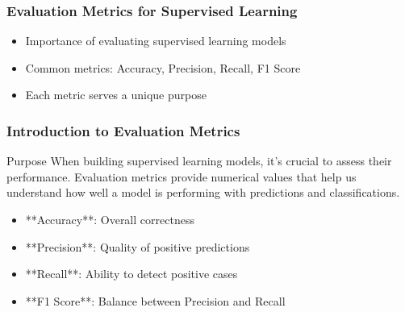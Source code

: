 \documentclass[aspectratio=169]{beamer}
\begin{document}
\begin{frame}[fragile]
    \frametitle{Evaluation Metrics for Supervised Learning}
    
    \begin{itemize}
        \item Importance of evaluating supervised learning models
        \item Common metrics: Accuracy, Precision, Recall, F1 Score
        \item Each metric serves a unique purpose
    \end{itemize}
\end{frame}

\begin{frame}[fragile]
    \frametitle{Introduction to Evaluation Metrics}
    
    \begin{block}{Purpose}
        When building supervised learning models, it's crucial to assess their performance. Evaluation metrics provide numerical values that help us understand how well a model is performing with predictions and classifications.
    \end{block}
    
    \begin{itemize}
        \item **Accuracy**: Overall correctness
        \item **Precision**: Quality of positive predictions
        \item **Recall**: Ability to detect positive cases
        \item **F1 Score**: Balance between Precision and Recall
    \end{itemize}
\end{frame}
\end{document}
